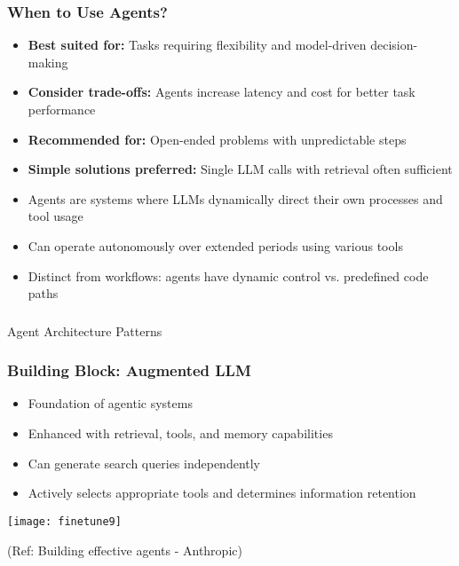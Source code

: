 \begin{frame}[fragile]\frametitle{When to Use Agents?}
\begin{itemize}
    \item \textbf{Best suited for:} Tasks requiring flexibility and model-driven decision-making
    \item \textbf{Consider trade-offs:} Agents increase latency and cost for better task performance
    \item \textbf{Recommended for:} Open-ended problems with unpredictable steps
    \item \textbf{Simple solutions preferred:} Single LLM calls with retrieval often sufficient
    \item Agents are systems where LLMs dynamically direct their own processes and tool usage
    \item Can operate autonomously over extended periods using various tools
    \item Distinct from workflows: agents have dynamic control vs. predefined code paths
\end{itemize}
\end{frame}

\begin{frame}[fragile]\frametitle{}
\begin{center}
{\Large Agent Architecture Patterns}
\end{center}
\end{frame}

\begin{frame}[fragile]\frametitle{Building Block: Augmented LLM}
\begin{itemize}
    \item Foundation of agentic systems
    \item Enhanced with retrieval, tools, and memory capabilities
    \item Can generate search queries independently
    \item Actively selects appropriate tools and determines information retention
\end{itemize}

\begin{center}
\texttt{[image: finetune9]}
\end{center}

{\tiny (Ref: Building effective agents - Anthropic)}
\end{frame}

